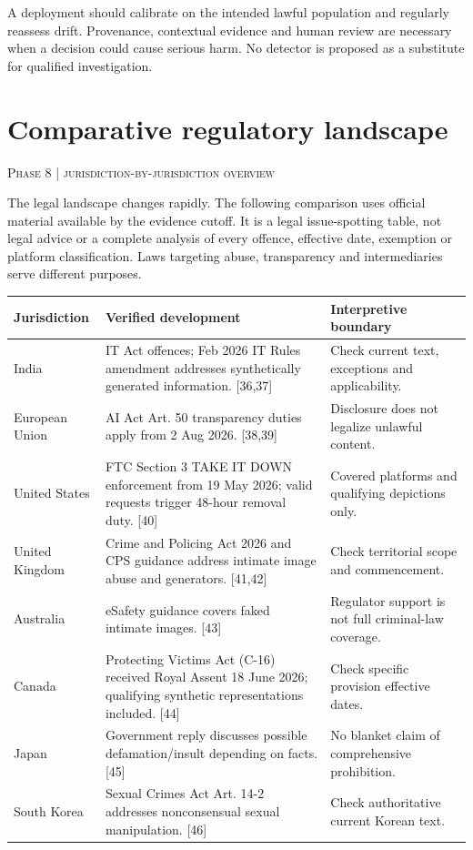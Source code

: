 \documentclass[11pt,a4paper]{article}
\newcommand{\sect}[2]{\section{#1}\textcolor{muted}{\small\textsc{#2}}\par\vspace{2mm}}
\begin{document}
A deployment should calibrate on the intended lawful population and regularly reassess drift. Provenance, contextual evidence and human review are necessary when a decision could cause serious harm. No detector is proposed as a substitute for qualified investigation. \cite{nist,genimage}


\clearpage\sect{Comparative regulatory landscape}{Phase 8 | jurisdiction-by-jurisdiction overview}

The legal landscape changes rapidly. The following comparison uses official material available by the evidence cutoff. It is a legal issue-spotting table, not legal advice or a complete analysis of every offence, effective date, exemption or platform classification. Laws targeting abuse, transparency and intermediaries serve different purposes.


\begin{center}\small\begin{tabularx}{\linewidth}{@{}>{\RaggedRight\arraybackslash}p{.19\linewidth}>{\RaggedRight\arraybackslash}p{.46\linewidth}>{\RaggedRight\arraybackslash}p{.28\linewidth}@{}}\toprule
\textbf{Jurisdiction} & \textbf{Verified development} & \textbf{Interpretive boundary}\\\midrule
India & IT Act offences; Feb 2026 IT Rules amendment addresses synthetically generated information. [36,37] & Check current text, exceptions and applicability.\\
European Union & AI Act Art. 50 transparency duties apply from 2 Aug 2026. [38,39] & Disclosure does not legalize unlawful content.\\
United States & FTC Section 3 TAKE IT DOWN enforcement from 19 May 2026; valid requests trigger 48-hour removal duty. [40] & Covered platforms and qualifying depictions only.\\
United Kingdom & Crime and Policing Act 2026 and CPS guidance address intimate image abuse and generators. [41,42] & Check territorial scope and commencement.\\
Australia & eSafety guidance covers faked intimate images. [43] & Regulator support is not full criminal-law coverage.\\
Canada & Protecting Victims Act (C-16) received Royal Assent 18 June 2026; qualifying synthetic representations included. [44] & Check specific provision effective dates.\\
Japan & Government reply discusses possible defamation/insult depending on facts. [45] & No blanket claim of comprehensive prohibition.\\
South Korea & Sexual Crimes Act Art. 14-2 addresses nonconsensual sexual manipulation. [46] & Check authoritative current Korean text.\\\bottomrule\end{tabularx}\end{center}
\end{document}
